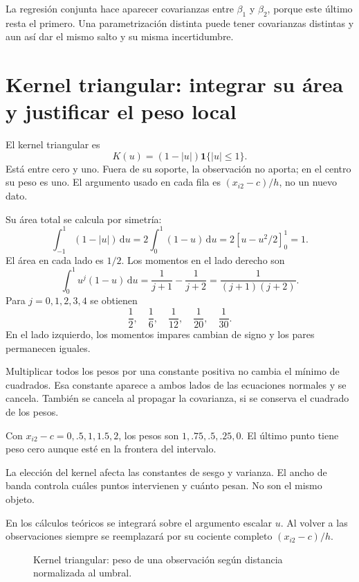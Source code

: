 \documentclass[11pt,a4paper]{article}
\newcommand{\dd}{\,\mathrm d}
\begin{document}
La regresión conjunta hace aparecer
covarianzas entre \(\beta_1\) y \(\beta_2\),
porque este último resta el primero.
Una parametrización distinta puede tener
covarianzas distintas y aun así dar
el mismo salto y su misma incertidumbre.

\clearpage
\section{Kernel triangular: integrar su área y justificar el peso local}\label{unidad24}
El kernel triangular es
\[
K(u)=(1-|u|)\mathbf1\{|u|\le1\}.
\]
Está entre cero y uno.
Fuera de su soporte, la observación no aporta;
en el centro su peso es uno.
El argumento usado en cada fila es
\((x_{i2}-c)/h\), no un nuevo dato.

Su área total se calcula por simetría:
\[
\int_{-1}^1(1-|u|)\dd u
=2\int_0^1(1-u)\dd u
=2[u-u^2/2]_0^1=1.
\]
El área en cada lado es \(1/2\).
Los momentos en el lado derecho son
\[
\int_0^1u^j(1-u)\dd u
=\frac1{j+1}-\frac1{j+2}
=\frac1{(j+1)(j+2)}.
\]
Para \(j=0,1,2,3,4\) se obtienen
\[
\frac12,\quad\frac16,\quad\frac1{12},
\quad\frac1{20},\quad\frac1{30}.
\]
En el lado izquierdo, los momentos impares
cambian de signo y los pares permanecen iguales.

Multiplicar todos los pesos por una constante
positiva no cambia el mínimo de cuadrados.
Esa constante aparece a ambos lados
de las ecuaciones normales y se cancela.
También se cancela al propagar la covarianza,
si se conserva el cuadrado de los pesos.

\begin{ejemplo}
Con \(x_{i2}-c=0,.5,1,1.5,2\),
los pesos son \(1,.75,.5,.25,0\).
El último punto tiene peso cero
aunque esté en la frontera del intervalo.
\end{ejemplo}
La elección del kernel afecta las constantes
de sesgo y varianza.
El ancho de banda controla cuáles puntos
intervienen y cuánto pesan.
No son el mismo objeto.

En los cálculos teóricos se integrará
sobre el argumento escalar \(u\).
Al volver a las observaciones siempre se
reemplazará por su cociente completo
\((x_{i2}-c)/h\).

\begin{figure}[H]\centering
{}
\caption{Kernel triangular: peso de una observación según distancia normalizada al umbral.}
\end{figure}
\end{document}

